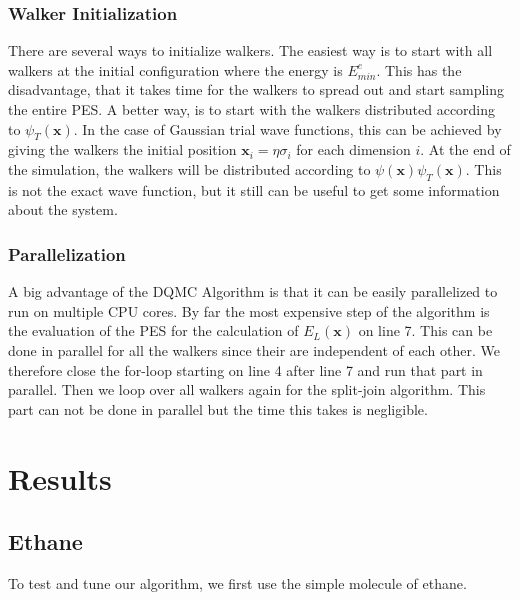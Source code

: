 \documentclass [12pt]{report}
\begin{document}
\subsection{Walker Initialization}
There are several ways to initialize walkers. The easiest way is to start with all walkers at the initial configuration where the energy is $E^e_{min}$. This has the disadvantage, that it takes time for the walkers to spread out and start sampling the entire PES. A better way, is to start with the walkers distributed according to $\psi_T(\bm{x})$. In the case of Gaussian trial wave functions, this can be achieved by giving the walkers the initial position $\bm{x}_i = \eta \sigma_i$ for each dimension $i$.
At the end of the simulation, the walkers will be distributed according to $\psi(\bm{x})\psi_T(\bm{x})$. This is not the exact wave function, but it still can be useful to get some information about the system.
\subsection{Parallelization}
A big advantage of the DQMC Algorithm is that it can be easily parallelized to run on multiple CPU cores. By far the most expensive step of the algorithm is the evaluation of the PES for the calculation of $E_L(\bm{x})$ on line 7. This can be done in parallel for all the walkers since their are independent of each other. We therefore close the for-loop starting on line 4 after line 7 and run that part in parallel. Then we loop over all walkers again for the split-join algorithm. This part can not be done in parallel but the time this takes is negligible. \\

\chapter{Results}

\section{Ethane}
To test and tune our algorithm, we first use the simple molecule of ethane.
\end{document}
